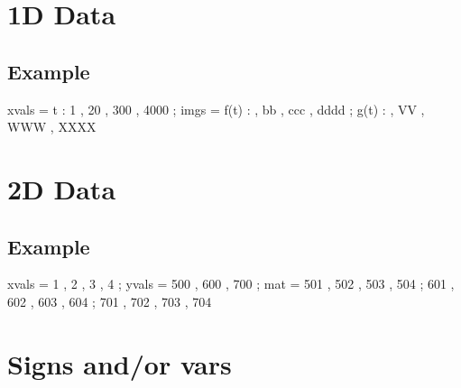 \documentclass[12pt]{article}
\begin{document}


\section{1D Data}

\subsection{Example \thesubsection}

\begin{functable}
    xvals =    t : 1 , 20 , 300 , 4000 ;
    imgs  = f(t) :  , bb , ccc , dddd ;
            g(t) :  , VV , WWW , XXXX
\end{functable}




\section{2D Data}


\subsection{Example \thesubsection}

\begin{functable}
    xvals = 1  , 2  , 3  , 4 ;
    yvals = 500 , 600 , 700 ;
    mat   = 501 , 502 , 503 , 504 ;
            601 , 602 , 603 , 604 ;
            701 , 702 , 703 , 704
\end{functable}




\section{Signs and/or vars}



%


%
%
%
%


%
%
%
\end{document}
